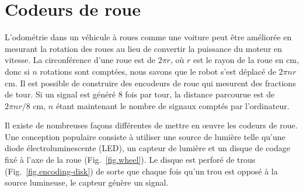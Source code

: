 \section{Codeurs de roue}\label{s.wheel}

L'odométrie dans un véhicule à roues comme une voiture peut être améliorée en mesurant la rotation des roues au lieu de convertir la puissance du moteur en vitesse. La circonférence d'une roue est de $2\pi r$, où $r$ est le rayon de la roue en cm, donc si $n$ rotations sont comptées, nous savons que le robot s'est déplacé de $2\pi n r$ cm. Il est possible de construire des encodeurs de roue qui mesurent des fractions de tour. Si un signal est généré $8$ fois par tour, la distance parcourue est de $2\pi nr /8$ cm, $n$ étant maintenant le nombre de signaux comptés par l'ordinateur.

Il existe de nombreuses façons différentes de mettre en œuvre les codeurs de roue. Une conception populaire consiste à utiliser une source de lumière telle qu'une diode électroluminescente (LED), un capteur de lumière et un disque de codage fixé à l'axe de la roue (Fig.~\ref{fig.wheel}). Le disque est perforé de trous (Fig.~\ref{fig.encoding-disk}) de sorte que chaque fois qu'un trou est opposé à la source lumineuse, le capteur génère un signal.

